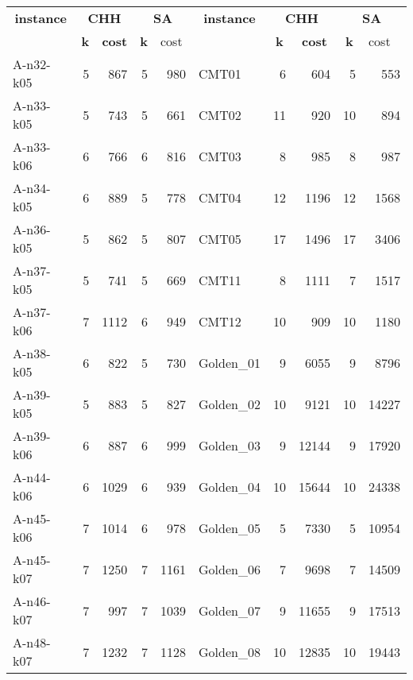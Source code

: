 \begin{table}[!h]
    \begin{center}
    \begin{tabular}{|l|r|r|r|r|l|r|r|r|r|}
    \hline
    \multicolumn{ 1}{|c|}{\textbf{instance}} & \multicolumn{ 2}{c|}{\textbf{CHH}} & \multicolumn{ 2}{c|}{\textbf{SA}} & \multicolumn{ 1}{c|}{\textbf{instance}} & \multicolumn{ 2}{c|}{\textbf{CHH}} & \multicolumn{ 2}{c|}{\textbf{SA}} \\ \cline{ 2- 5}\cline{ 7- 10}
    \multicolumn{ 1}{|c|}{} & \multicolumn{1}{c|}{\textbf{k}} & \multicolumn{1}{c|}{\textbf{cost}} & \multicolumn{1}{c|}{\textbf{k}} & \multicolumn{1}{l|}{cost} & \multicolumn{ 1}{c|}{} & \multicolumn{1}{c|}{\textbf{k}} & \multicolumn{1}{c|}{\textbf{cost}} & \multicolumn{1}{c|}{\textbf{k}} & \multicolumn{1}{l|}{cost} \\ \hline
    A-n32-k05 & 5 & 867 & 5 & 980 & CMT01 & 6 & 604 & 5 & 553 \\ \hline
    A-n33-k05 & 5 & 743 & 5 & 661 & CMT02 & 11 & 920 & 10 & 894 \\ \hline
    A-n33-k06 & 6 & 766 & 6 & 816 & CMT03 & 8 & 985 & 8 & 987 \\ \hline
    A-n34-k05 & 6 & 889 & 5 & 778 & CMT04 & 12 & 1196 & 12 & 1568 \\ \hline
    A-n36-k05 & 5 & 862 & 5 & 807 & CMT05 & 17 & 1496 & 17 & 3406 \\ \hline
    A-n37-k05 & 5 & 741 & 5 & 669 & CMT11 & 8 & 1111 & 7 & 1517 \\ \hline
    A-n37-k06 & 7 & 1112 & 6 & 949 & CMT12 & 10 & 909 & 10 & 1180 \\ \hline
    A-n38-k05 & 6 & 822 & 5 & 730 & Golden\_01 & 9 & 6055 & 9 & 8796 \\ \hline
    A-n39-k05 & 5 & 883 & 5 & 827 & Golden\_02 & 10 & 9121 & 10 & 14227 \\ \hline
    A-n39-k06 & 6 & 887 & 6 & 999 & Golden\_03 & 9 & 12144 & 9 & 17920 \\ \hline
    A-n44-k06 & 6 & 1029 & 6 & 939 & Golden\_04 & 10 & 15644 & 10 & 24338 \\ \hline
    A-n45-k06 & 7 & 1014 & 6 & 978 & Golden\_05 & 5 & 7330 & 5 & 10954 \\ \hline
    A-n45-k07 & 7 & 1250 & 7 & 1161 & Golden\_06 & 7 & 9698 & 7 & 14509 \\ \hline
    A-n46-k07 & 7 & 997 & 7 & 1039 & Golden\_07 & 9 & 11655 & 9 & 17513 \\ \hline
    A-n48-k07 & 7 & 1232 & 7 & 1128 & Golden\_08 & 10 & 12835 & 10 & 19443 \\ \hline

\end{tabular}
\end{center}
\end{table}
